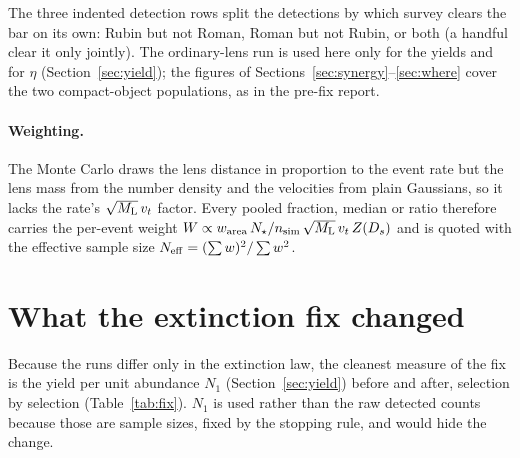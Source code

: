 \documentclass[english,10pt,a4paper]{article}
\newcommand{\Ml}{M_{\rm L}}
\newcommand{\Neff}{N_{\rm eff}}
\begin{document}
The three indented detection rows split the detections by which survey clears the bar on its own:
Rubin but not Roman, Roman but not Rubin, or both (a handful clear it only jointly). The ordinary-lens run is used here only for the yields and for $\eta$
(Section~\ref{sec:yield}); the figures of Sections~\ref{sec:synergy}--\ref{sec:where} cover the
two compact-object populations, as in the pre-fix report.

\paragraph{Weighting.} The Monte Carlo draws the lens distance in proportion to the event rate but
the lens mass from the number density and the velocities from plain Gaussians, so it lacks the
rate's $\sqrt{\Ml}\,v_t$ factor. Every pooled fraction, median or ratio therefore carries the
per-event weight $W \propto w_{\rm area}\,N_\star/n_{\rm sim}\,\sqrt{\Ml}\,v_t\,Z(D_s)$ and is
quoted with the \citet{Kish1965} effective sample size $\Neff = (\sum w)^2/\sum w^2$.

\section{What the extinction fix changed}
\label{sec:fix}

Because the runs differ only in the extinction law, the cleanest measure of the fix is the yield
per unit abundance $N_1$ (Section~\ref{sec:yield}) before and after, selection by selection
(Table~\ref{tab:fix}). $N_1$ is used rather than the raw detected counts because those are sample
sizes, fixed by the stopping rule, and would hide the change.
\end{document}
